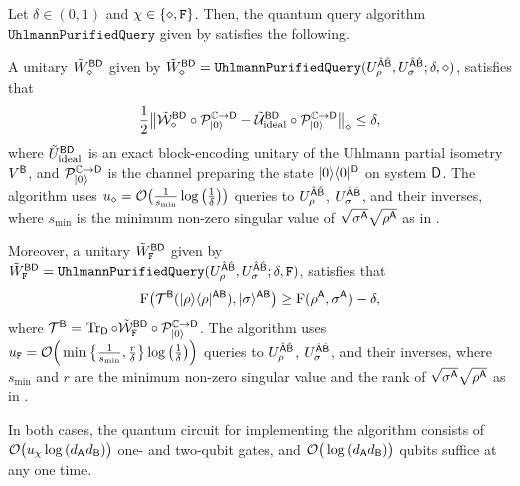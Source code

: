 \begin{theorem}
\label{thm:Uhlmann alg purif query model}
Let $\delta \in (0, 1)$ and $\chi \in \{\diamond, \mathtt{F}\}$. Then, the quantum query algorithm $\mathtt{UhlmannPurifiedQuery}$ given by  satisfies the following. 

A unitary $\tilde{W}_\diamond^{{\mathsf{B}}{\mathsf{D}}}$ given by $\tilde{W}_\diamond^{{\mathsf{B}}{\mathsf{D}}} = \mathtt{UhlmannPurifiedQuery}(U_\rho^{\hat{{\mathsf{A}}}\hat{{\mathsf{B}}}}, U_\sigma^{\hat{{\mathsf{A}}}\hat{{\mathsf{B}}}}; \delta, \diamond)$, satisfies that
\begin{equation}
\label{eq:error purif access}
    \frac{1}{2}\big\|\tilde{{\mathcal{W}}}_\diamond^{{\mathsf{B}}{\mathsf{D}}} \circ{\mathcal{P}}_{|0\rangle}^{\mathbb{C}\rightarrow{\mathsf{D}}} - \tilde{{\mathcal{U}}}_{\rm ideal}^{{\mathsf{B}}{\mathsf{D}}}\circ{\mathcal{P}}_{|0\rangle}^{\mathbb{C}\rightarrow{\mathsf{D}}}\big\|_\diamond
    \leq \delta,
\end{equation}
where $\tilde{U}_{\rm ideal}^{{\mathsf{B}}{\mathsf{D}}}$ is an exact block-encoding unitary of the Uhlmann partial isometry $V^{\mathsf{B}}$, and ${\mathcal{P}}_{|0\rangle}^{\mathbb{C}\rightarrow{\mathsf{D}}}$ is the channel preparing the state $|0\rangle\langle0|^{\mathsf{D}}$ on system ${\mathsf{D}}$.
The algorithm uses $u_\diamond = {\mathcal{O}}\big(\frac{1}{s_{\rm min}}\log{\big(\frac{1}{\delta}\big)}\big)$ queries to $U_\rho^{\hat{{\mathsf{A}}}\hat{{\mathsf{B}}}}$, $U_\sigma^{\hat{{\mathsf{A}}}\hat{{\mathsf{B}}}}$, and their inverses, where $s_{\min}$ is the minimum non-zero singular value of $\sqrt{\sigma^{{\mathsf{A}}}}\sqrt{\rho^{{\mathsf{A}}}}$ as in .

Moreover, a unitary $\tilde{W}_{\mathtt{F}}^{{\mathsf{B}}{\mathsf{D}}}$ given by $\tilde{W}_{\mathtt{F}}^{{\mathsf{B}}{\mathsf{D}}} = \mathtt{UhlmannPurifiedQuery}(U_\rho^{\hat{{\mathsf{A}}}\hat{{\mathsf{B}}}}, U_\sigma^{\hat{{\mathsf{A}}}\hat{{\mathsf{B}}}}; \delta, \mathtt{F})$, satisfies that 
\begin{align}
        {\mathrm{F}}\big({\mathcal{T}}^{\mathsf{B}}(|\rho\rangle\langle\rho|^{{\mathsf{A}}{\mathsf{B}}}), |\sigma\rangle^{{\mathsf{A}}{\mathsf{B}}}\big) \geq {\mathrm{F}}(\rho^{\mathsf{A}}, \sigma^{\mathsf{A}}) - \delta,
\end{align}
where ${\mathcal{T}}^{\mathsf{B}} = \operatorname{Tr}_{{\mathsf{D}}}\circ\tilde{{\mathcal{W}}}_{\mathtt{F}}^{{\mathsf{B}}{\mathsf{D}}}\circ{\mathcal{P}}_{|0\rangle}^{\mathbb{C}\rightarrow{\mathsf{D}}}$.
The algorithm uses $u_{\mathtt{F}} = {\mathcal{O}}\Big(\min\big\{\frac{1}{s_{\rm min}}, \frac{r}{\delta}\big\}\log{\big(\frac{1}{\delta}\big)}\Big)$ queries to $U_\rho^{\hat{{\mathsf{A}}}\hat{{\mathsf{B}}}}$, $U_\sigma^{\hat{{\mathsf{A}}}\hat{{\mathsf{B}}}}$, and their inverses, where $s_{\min}$ and $r$ are the minimum non-zero singular value and the rank of $\sqrt{\sigma^{\mathsf{A}}}\sqrt{\rho^{\mathsf{A}}}$ as in .

In both cases, the quantum circuit for implementing the algorithm consists of ${\mathcal{O}}\big(u_\chi \log{(d_{\mathsf{A}}d_{\mathsf{B}})}\big)$ one- and two-qubit gates, and ${\mathcal{O}}\big(\log{(d_{\mathsf{A}}d_{\mathsf{B}})}\big)$ qubits suffice at any one time.
\end{theorem}




